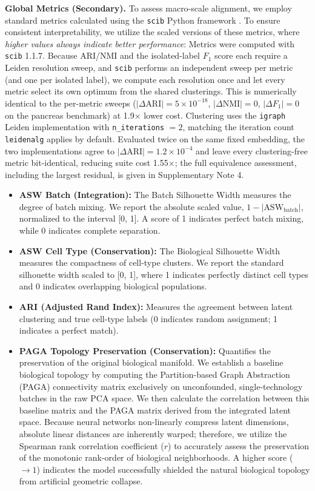 \documentclass[unnumsec,webpdf,contemporary,large]{oup-authoring-template}%
\theoremstyle{thmstyleone}%
\theoremstyle{thmstyletwo}%
\theoremstyle{thmstylethree}%
\begin{document}
\textbf{Global Metrics (Secondary).} To assess macro-scale alignment, we employ standard metrics calculated using the \texttt{scib} Python framework \citep{Luecken2022-fb}. To ensure consistent interpretability, we utilize the scaled versions of these metrics, where \textit{higher values always indicate better performance}: Metrics were computed with \texttt{scib} 1.1.7. Because ARI/NMI and the isolated-label $F_1$ score each require a Leiden resolution sweep, and \texttt{scib} performs an independent sweep per metric (and one per isolated label), we compute each resolution once and let every metric select its own optimum from the shared clusterings. This is numerically identical to the per-metric sweeps ($|\Delta\text{ARI}| = 5 \times 10^{-18}$, $|\Delta\text{NMI}| = 0$, $|\Delta F_1| = 0$ on the pancreas benchmark) at 1.9$\times$ lower cost. Clustering uses the \texttt{igraph} Leiden implementation with \texttt{n\_iterations} $=2$, matching the iteration count \texttt{leidenalg} applies by default. Evaluated twice on the same fixed embedding, the two implementations agree to $|\Delta\text{ARI}| = 1.2 \times 10^{-4}$ and leave every clustering-free metric bit-identical, reducing suite cost 1.55$\times$; the full equivalence assessment, including the largest residual, is given in Supplementary Note 4.
\begin{itemize}
    \item \textbf{ASW Batch (Integration):} The Batch Silhouette Width measures the degree of batch mixing. We report the absolute scaled value, $1 - \lvert\text{ASW}_{\text{batch}}\rvert$, normalized to the interval [0, 1]. A score of 1 indicates perfect batch mixing, while 0 indicates complete separation.
    \item \textbf{ASW Cell Type (Conservation):} The Biological Silhouette Width measures the compactness of cell-type clusters. We report the standard silhouette width scaled to [0, 1], where 1 indicates perfectly distinct cell types and 0 indicates overlapping biological populations.
    \item \textbf{ARI (Adjusted Rand Index):} Measures the agreement between latent clustering and true cell-type labels (0 indicates random assignment; 1 indicates a perfect match).
    \item \textbf{PAGA Topology Preservation (Conservation):} Quantifies the preservation of the original biological manifold. We establish a baseline biological topology by computing the Partition-based Graph Abstraction (PAGA) \citep{Wolf2019-paga} connectivity matrix exclusively on unconfounded, single-technology batches in the raw PCA space. We then calculate the correlation between this baseline matrix and the PAGA matrix derived from the integrated latent space. Because neural networks non-linearly compress latent dimensions, absolute linear distances are inherently warped; therefore, we utilize the Spearman rank correlation coefficient ($r$) to accurately assess the preservation of the monotonic rank-order of biological neighborhoods. A higher score ($\rightarrow 1$) indicates the model successfully shielded the natural biological topology from artificial geometric collapse.
\end{itemize}
\end{document}
